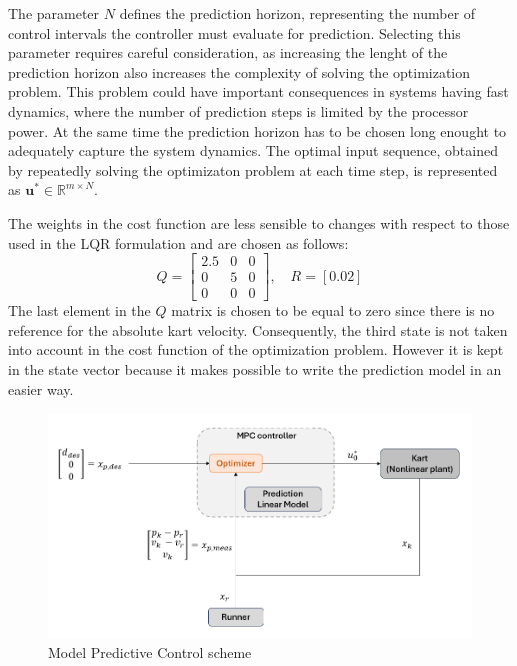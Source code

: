 \documentclass[a4paper,12pt,oneside]{book}
\begin{document}
\bigskip
The parameter $N$ defines the prediction horizon, representing the number of control intervals the controller must evaluate for prediction. 
Selecting this parameter requires careful consideration, as increasing the lenght of the prediction horizon also increases the complexity of solving the optimization problem.
This problem could have important consequences in systems having fast dynamics, where the number of prediction steps is limited by the processor power.
At the same time the prediction horizon has to be chosen long enought to adequately capture the system dynamics.
The optimal input sequence, obtained by repeatedly solving the optimizaton problem at each time step, is represented as $\boldsymbol{u}^* \in \mathbb{R}^{m \times N}$.

\bigskip
The weights in the cost function are less sensible to changes with respect to those used in the LQR formulation and are chosen as follows:
\begin{equation}
    Q =
    \begin{bmatrix}
        2.5 & 0 & 0 \\
        0 & 5 & 0 \\
        0 & 0 & 0
    \end{bmatrix},
    \quad
    R = [0.02]    
\end{equation}
The last element in the $Q$ matrix is chosen to be equal to zero since there is no reference for the absolute kart velocity.
Consequently, the third state is not taken into account in the cost function of the optimization problem.
However it is kept in the state vector because it makes possible to write the prediction model in an easier way.

\begin{figure}
	\centering
	\includegraphics[width=1.0\textwidth]{MPC_sim_scheme.png}
	\caption{Model Predictive Control scheme}
	\label{image:MPC_sim_scheme}
\end{figure}
\end{document}
